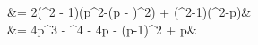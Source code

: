 \documentclass{article}
\begin{document}
\begin{description}[leftmargin=*]
\begin{framed}
\begin{description}
\begin{flalign*}
				&= 2\cdot(\left\lceil{}\right\rceil^2 - 1)\cdot(p^2-(p - \left\lceil{}\right\rceil)^2) + (\left\lceil{}\right\rceil^2-1)\cdot(\left\lceil{}\right\rceil^2-p)&\\
				&= 4\cdot p\cdot\left\lceil{}\right\rceil^3 - \left\lceil{}\right\rceil^4 - 4\cdot p \cdot\left\lceil{}\right\rceil - (p-1)\cdot \left\lceil{}\right\rceil^2 + p&\\
			\end{flalign*}
		\end{description}
	\end{framed}
\end{description}
\end{document}
